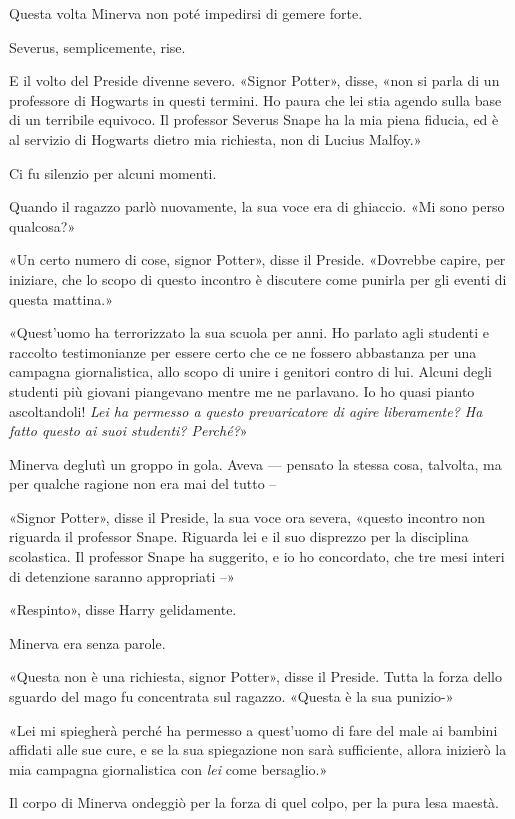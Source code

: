 Questa volta Minerva non poté impedirsi di gemere forte.

Severus, semplicemente, rise.

E il volto del Preside divenne severo. «Signor Potter», disse, «non si parla di un professore di Hogwarts in questi termini. Ho paura che lei stia agendo sulla base di un terribile equivoco. Il professor Severus Snape ha la mia piena fiducia, ed è al servizio di Hogwarts dietro mia richiesta, non di Lucius Malfoy.»

Ci fu silenzio per alcuni momenti.

Quando il ragazzo parlò nuovamente, la sua voce era di ghiaccio. «Mi sono perso qualcosa?»

«Un certo numero di cose, signor Potter», disse il Preside. «Dovrebbe capire, per iniziare, che lo scopo di questo incontro è discutere come punirla per gli eventi di questa mattina.»

«Quest’uomo ha terrorizzato la sua scuola per anni. Ho parlato agli studenti e raccolto testimonianze per essere certo che ce ne fossero abbastanza per una campagna giornalistica, allo scopo di unire i genitori contro di lui. Alcuni degli studenti più giovani piangevano mentre me ne parlavano. Io ho quasi pianto ascoltandoli! \textit{Lei ha permesso a questo prevaricatore di agire liberamente? Ha fatto questo ai suoi studenti? Perché?}»

Minerva deglutì un groppo in gola. Aveva — pensato la stessa cosa, talvolta, ma per qualche ragione non era mai del tutto –

«Signor Potter», disse il Preside, la sua voce ora severa, «questo incontro non riguarda il professor Snape. Riguarda lei e il suo disprezzo per la disciplina scolastica. Il professor Snape ha suggerito, e io ho concordato, che tre mesi interi di detenzione saranno appropriati –»

«Respinto», disse Harry gelidamente.

Minerva era senza parole.

«Questa non è una richiesta, signor Potter», disse il Preside. Tutta la forza dello sguardo del mago fu concentrata sul ragazzo. «Questa è la sua punizio-»

«Lei mi spiegherà perché ha permesso a quest’uomo di fare del male ai bambini affidati alle sue cure, e se la sua spiegazione non sarà sufficiente, allora inizierò la mia campagna giornalistica con \textit{lei} come bersaglio.»

Il corpo di Minerva ondeggiò per la forza di quel colpo, per la pura lesa maestà.

